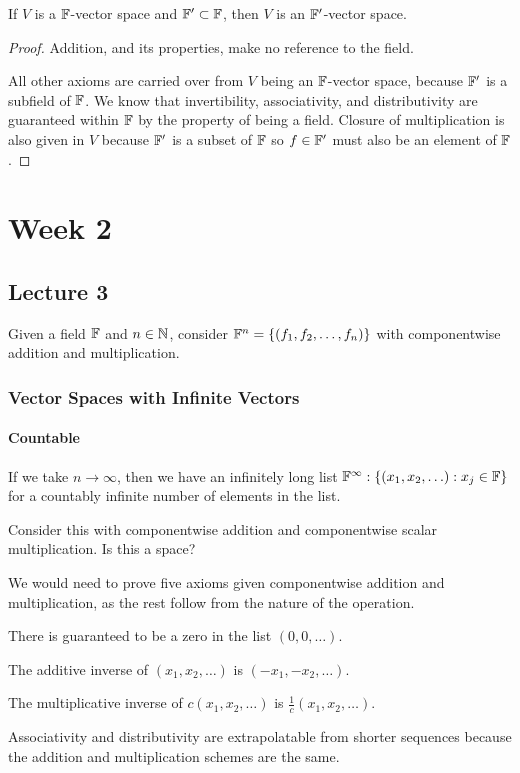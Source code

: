 \documentclass{book}
\begin{document}
\begin{hw}
	If $V$ is a $\mathbb{F}$-vector space and $\mathbb{F}' \subset \mathbb{F}$, then $V$ is an $\mathbb{F}'$-vector space.
\end{hw}

\begin{proof}
	Addition, and its properties, make no reference to the field.

	All other axioms are carried over from $V$ being an $\mathbb{F}$-vector space, because $\mathbb{F}'$ is a subfield of $\mathbb{F}$. We know that invertibility, associativity, and distributivity are guaranteed within $\mathbb{F}$ by the property of being a field. Closure of multiplication is also given in $V$ because $\mathbb{F}'$ is a subset of $\mathbb{F}$ so $f \in \mathbb{F}'$ must also be an element of $\mathbb{F}$.
\end{proof}

\chapter{Week 2}

\section{Lecture 3}
Given a field $\mathbb{F}$ and $n \in \mathbb{N}$, consider $\mathbb{F}^n = \{(f_1, f_2, \ldots, f_n)\}$ with componentwise addition and multiplication. 

\subsection{Vector Spaces with Infinite Vectors}
\subsubsection{Countable}
If we take $n \to \infty$, then we have an infinitely long list $\mathbb{F}^\infty : \{(x_1, x_2, \ldots) : x_j \in \mathbb{F}\}$ for a countably infinite number of elements in the list.

\begin{hw}
Consider this with componentwise addition and componentwise scalar multiplication. Is this a space?
\end{hw}

\begin{solution}
	We would need to prove five axioms given componentwise addition and multiplication, as the rest follow from the nature of the operation.

	There is guaranteed to be a zero in the list $(0, 0, \ldots).$ 

	The additive inverse of $(x_1, x_2, \ldots)$ is $(-x_1, -x_2, \ldots).$ 

	The multiplicative inverse of $c(x_1, x_2, \ldots)$ is $\frac{1}{c}(x_1, x_2, \ldots)$. 

	Associativity and distributivity are extrapolatable from shorter sequences because the addition and multiplication schemes are the same.
\end{solution}
\end{document}

